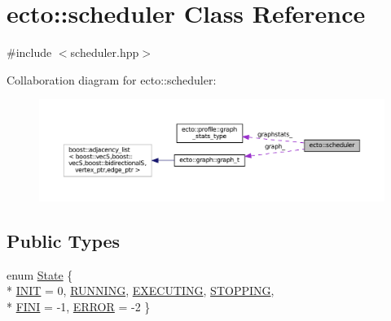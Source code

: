 \hypertarget{classecto_1_1scheduler}{}\section{ecto\+:\+:scheduler Class Reference}
\label{classecto_1_1scheduler}


{\ttfamily \#include $<$scheduler.\+hpp$>$}



Collaboration diagram for ecto\+:\+:scheduler\+:\nopagebreak
\begin{figure}[H]
\begin{center}
\leavevmode
\includegraphics[width=350pt]{classecto_1_1scheduler__coll__graph}
\end{center}
\end{figure}
\subsection*{Public Types}
\begin{DoxyCompactItemize}
\item 
enum \hyperlink{classecto_1_1scheduler_a6b063d1c4bb9dad58d7ace61946b1200}{State} \{ \\*
\hyperlink{classecto_1_1scheduler_a6b063d1c4bb9dad58d7ace61946b1200a347092c6b9c4bbc7084bfa04d9ffb57f}{I\+N\+IT} = 0, 
\hyperlink{classecto_1_1scheduler_a6b063d1c4bb9dad58d7ace61946b1200aef190614c39d85b915b9ff2225eacf02}{R\+U\+N\+N\+I\+NG}, 
\hyperlink{classecto_1_1scheduler_a6b063d1c4bb9dad58d7ace61946b1200a3e140c949a41686e2e0481d13e89c010}{E\+X\+E\+C\+U\+T\+I\+NG}, 
\hyperlink{classecto_1_1scheduler_a6b063d1c4bb9dad58d7ace61946b1200a0cf2ac365020f8cd0a6860a3983a0dad}{S\+T\+O\+P\+P\+I\+NG}, 
\\*
\hyperlink{classecto_1_1scheduler_a6b063d1c4bb9dad58d7ace61946b1200aa9b97654759582b6e92fbc17a31623bd}{F\+I\+NI} = -\/1, 
\hyperlink{classecto_1_1scheduler_a6b063d1c4bb9dad58d7ace61946b1200a45aebc05bdc20659645ad6e1729db520}{E\+R\+R\+OR} = -\/2
 \}
\end{DoxyCompactItemize}
